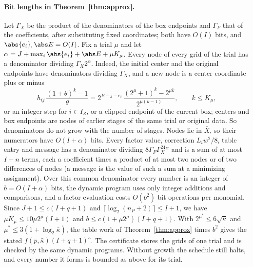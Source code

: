 \paragraph{Bit lengths in Theorem~\ref{thm:approx}.}
Let $\Gamma_X$ be the product of the denominators of the box endpoints and
$\Gamma_F$ that of the coefficients, after substituting fixed coordinates;
both have $O(I)$ bits, and $\abs{e_i},\abs E=O(I)$. Fix a trial $\mu$ and let
$\alpha=J+\max_i\abs{e_i}+\abs E+\mu K_\mu$. Every node of every grid of the
trial has a denominator dividing $\Gamma_X2^\alpha$. Indeed, the initial
center and the original endpoints have denominators dividing $\Gamma_X$, and a
new node is a center coordinate plus or minus
\[
h_{ij}\,\frac{(1+\theta)^k-1}{\theta}
=2^{E-j-e_i}\,\frac{(2^\mu+1)^k-2^{\mu k}}{2^{\mu(k-1)}},\qquad k\le K_\mu,
\]
or an integer step for $i\in I_Z$, or a clipped endpoint of the current box;
centers and box endpoints are nodes of earlier stages of the same trial or
original data. So denominators do not grow with the number of stages. Nodes
lie in $\bar X$, so their numerators have $O(I+\alpha)$ bits. Every factor
value, correction $L_iw^2/8$, table entry and message has a denominator
dividing $8\Gamma_F\Gamma_X^24^\alpha$ and is a sum of at most $I+n$ terms,
each a coefficient times a product of at most two nodes or of two
differences of nodes (a message is the value of such a sum at a minimizing
assignment). Over this common denominator every number is an integer of
$b=O(I+\alpha)$ bits, the dynamic program uses only integer additions and
comparisons, and a factor evaluation costs $O(b^2)$ bit operations per
monomial. Since $J+1\le c(I+q+1)$ and $\lceil\log_2(n_P+2)\rceil\le I+1$, we
have $\mu K_\mu\le10\mu2^\mu(I+1)$ and $b\le c(1+\mu2^\mu)(I+q+1)$. With
$2^{\mu^*}\le6\sqrt{\bar\kappa}$ and $\mu^*\le3(1+\log_2\bar\kappa)$, the
table work of Theorem~\ref{thm:approx} times $b^2$ gives the stated
$f(p,\bar\kappa)(I+q+1)^5$. The certificate stores the grids of one trial and
is checked by the same dynamic programs. Without growth the schedule still
halts, and every number it forms is bounded as above for its trial.

